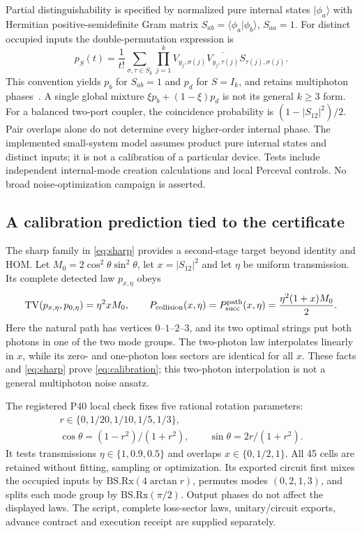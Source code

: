\documentclass[11pt,a4paper]{article}
\theoremstyle{remark}\newtheorem{remark}[theorem]{Remark}
\DeclareMathOperator{\TV}{TV}
\newcommand{\succp}{P_{\mathrm{succ}}}
\providecommand{\CalibrationCellCount}{45}
\begin{document}
Partial distinguishability is specified by normalized pure internal states $|\phi_a\rangle$ with Hermitian positive-semidefinite Gram matrix $S_{ab}=\langle\phi_a|\phi_b\rangle$, $S_{aa}=1$. For distinct occupied inputs the double-permutation expression is
\begin{equation}
 p_S(t)=\frac1{t!}\sum_{\sigma,\tau\in S_k}
 \prod_{j=1}^k V_{y_j,\sigma(j)}\overline{V_{y_j,\tau(j)}}
 S_{\tau(j),\sigma(j)}.\label{eq:partial}
\end{equation}
This convention yields $p_b$ for $S_{ab}=1$ and $p_d$ for $S=I_k$, and retains multiphoton phases~\cite{tichy2015}. A single global mixture $\xi p_b+(1-\xi)p_d$ is not its general $k\ge3$ form. For a balanced two-port coupler, the coincidence probability is $(1-|S_{12}|^2)/2$. Pair overlaps alone do not determine every higher-order internal phase. The implemented small-system model assumes product pure internal states and distinct inputs; it is not a calibration of a particular device. Tests include independent internal-mode creation calculations and local Perceval controls. No broad noise-optimization campaign is asserted.

\subsection{A calibration prediction tied to the certificate}
The sharp family in \cref{eq:sharp} provides a second-stage target beyond identity and HOM. Let $M_0=2\cos^2\theta\sin^2\theta$, let $x=|S_{12}|^2$ and let $\eta$ be uniform transmission. Its complete detected law $p_{x,\eta}$ obeys
\begin{equation}
 \TV(p_{x,\eta},p_{0,\eta})=\eta^2 xM_0,\qquad
 P_{\rm collision}(x,\eta)=\succp^{\rm path}(x,\eta)
 =\frac{\eta^2(1+x)M_0}{2}.\label{eq:calibration}
\end{equation}
Here the natural path has vertices $0$--$1$--$2$--$3$, and its two optimal strings put both photons in one of the two mode groups. The two-photon law interpolates linearly in $x$, while its zero- and one-photon loss sectors are identical for all $x$. These facts and \cref{eq:sharp} prove \cref{eq:calibration}; this two-photon interpolation is not a general multiphoton noise ansatz.

The registered P40 local check fixes five rational rotation parameters:
\begin{gather*}
 r\in\{0,1/20,1/10,1/5,1/3\},\\
 \cos\theta=(1-r^2)/(1+r^2),\qquad \sin\theta=2r/(1+r^2).
\end{gather*}
It tests transmissions $\eta\in\{1,0.9,0.5\}$ and overlaps $x\in\{0,1/2,1\}$. All \CalibrationCellCount{} cells are retained without fitting, sampling or optimization. Its exported circuit first mixes the occupied inputs by $\mathrm{BS.Rx}(4\arctan r)$, permutes modes $(0,2,1,3)$, and splits each mode group by $\mathrm{BS.Rx}(\pi/2)$. Output phases do not affect the displayed laws. The script, complete loss-sector laws, unitary/circuit exports, advance contract and execution receipt are supplied separately.
\end{document}
